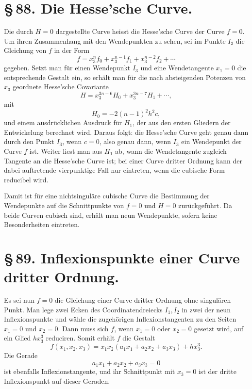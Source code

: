 \documentclass[11pt]{article}
\begin{document}
\section*{\S\,88. Die Hesse'sche Curve.}

Die durch $H=0$ dargestellte Curve heisst die Hesse'sche Curve der Curve $f=0$. Um ihren Zusammenhang mit den Wendepunkten zu sehen, sei im Punkte $I_3$ die Gleichung von $f$ in der Form
\begin{equation}
 f=x_3^n f_0+x_3^{n-1}f_1+x_3^{n-2}f_2+\cdots
 \tag{1}
\end{equation}
gegeben. Setzt man für einen Wendepunkt $I_3$ und eine Wendetangente $x_1=0$ die entsprechende Gestalt ein, so erhält man für die nach absteigenden Potenzen von $x_3$ geordnete Hesse'sche Covariante
\begin{equation}
 H=x_3^{3n-6}H_0+x_3^{3n-7}H_1+\cdots,
 \tag{2}
\end{equation}
mit
\begin{equation}
 H_0=-2(n-1)^2h^2c,
 \tag{3}
\end{equation}
und einem ausdrücklichen Ausdruck für $H_1$, der aus den ersten Gliedern der Entwickelung berechnet wird. Daraus folgt: die Hesse'sche Curve geht genau dann durch den Punkt $I_3$, wenn $c=0$, also genau dann, wenn $I_3$ ein Wendepunkt der Curve $f$ ist. Weiter liest man aus $H_1$ ab, wann die Wendetangente zugleich Tangente an die Hesse'sche Curve ist; bei einer Curve dritter Ordnung kann der dabei auftretende vierpunktige Fall nur eintreten, wenn die cubische Form reducibel wird.

Damit ist für eine nichtsinguläre cubische Curve die Bestimmung der Wendepunkte auf die Schnittpunkte von $f=0$ und $H=0$ zurückgeführt. Da beide Curven cubisch sind, erhält man neun Wendepunkte, sofern keine Besonderheiten eintreten.

\section*{\S\,89. Inflexionspunkte einer Curve dritter Ordnung.}

Es sei nun $f=0$ die Gleichung einer Curve dritter Ordnung ohne singulären Punkt. Man lege zwei Ecken des Coordinatendreiecks $I_1,I_2$ in zwei der neun Inflexionspunkte und wähle die zugehörigen Inflexionstangenten zu den Seiten $x_1=0$ und $x_2=0$. Dann muss sich $f$, wenn $x_1=0$ oder $x_2=0$ gesetzt wird, auf ein Glied $hx_3^3$ reduciren. Somit erhält $f$ die Gestalt
\begin{equation}
 f(x_1,x_2,x_3)=x_1x_2(a_1x_1+a_2x_2+a_3x_3)+hx_3^3.
 \tag{1}
\end{equation}
Die Gerade
\begin{equation}
 a_1x_1+a_2x_2+a_3x_3=0
 \tag{2}
\end{equation}
ist ebenfalls Inflexionstangente, und ihr Schnittpunkt mit $x_3=0$ ist der dritte Inflexionspunkt auf dieser Geraden.
\end{document}
